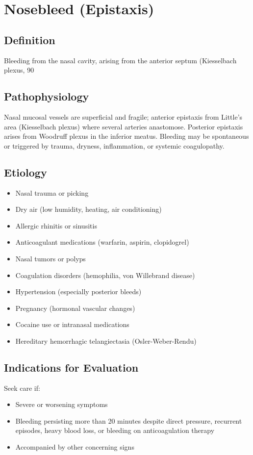 \chapter{Nosebleed (Epistaxis)}

\section*{Definition}
Bleeding from the nasal cavity, arising from the anterior septum (Kiesselbach plexus, 90%

\section*{Pathophysiology}
Nasal mucosal vessels are superficial and fragile; anterior epistaxis from Little's area (Kiesselbach plexus) where several arteries anastomose. Posterior epistaxis arises from Woodruff plexus in the inferior meatus. Bleeding may be spontaneous or triggered by trauma, dryness, inflammation, or systemic coagulopathy.

\section*{Etiology}
\begin{itemize}
  \item Nasal trauma or picking
  \item Dry air (low humidity, heating, air conditioning)
  \item Allergic rhinitis or sinusitis
  \item Anticoagulant medications (warfarin, aspirin, clopidogrel)
  \item Nasal tumors or polyps
  \item Coagulation disorders (hemophilia, von Willebrand disease)
  \item Hypertension (especially posterior bleeds)
  \item Pregnancy (hormonal vascular changes)
  \item Cocaine use or intranasal medications
  \item Hereditary hemorrhagic telangiectasia (Osler-Weber-Rendu)
\end{itemize}

\section*{Indications for Evaluation}
Seek care if:
\begin{itemize}
  \item Severe or worsening symptoms
  \item Bleeding persisting more than 20 minutes despite direct pressure, recurrent episodes, heavy blood loss, or bleeding on anticoagulation therapy
  \item Accompanied by other concerning signs
\end{itemize}

